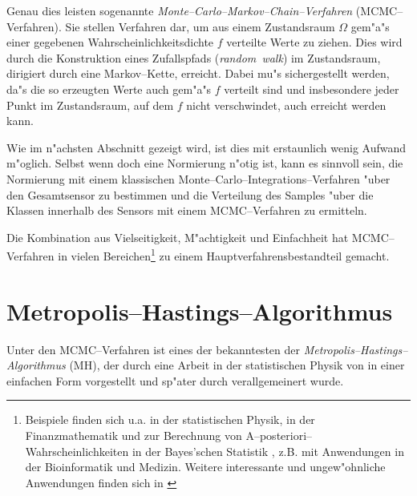 	Genau dies leisten sogenannte {\em Mon\-te--Car\-lo--Mar\-kov--Chain--Ver\-fahr\-en} (MCMC--Verfahren). Sie stellen Verfahren dar, um aus einem Zustandsraum $\Omega$ gem"a"s einer gegebenen Wahrscheinlichkeitsdichte $f$ verteilte Werte zu ziehen. Dies wird durch die Konstruktion eines Zufallspfads ({\em random~walk}) im Zustandsraum, dirigiert durch eine Markov--Kette, erreicht. Dabei mu"s sichergestellt werden, da"s die so erzeugten Werte auch gem"a"s $f$ verteilt sind und insbesondere jeder Punkt im Zustandsraum, auf dem $f$ nicht verschwindet, auch erreicht werden kann.
	
	Wie im n"achsten Abschnitt gezeigt wird, ist dies mit erstaunlich wenig Aufwand m"oglich. Selbst wenn doch eine Normierung n"otig ist, kann es sinnvoll sein, die Normierung mit einem klassischen Monte--Carlo--Integrations--Verfahren "uber den Gesamtsensor zu bestimmen und die Verteilung des Samples "uber die Klassen innerhalb des Sensors mit einem MCMC--Verfahren zu ermitteln.
	
	Die Kombination aus Vielseitigkeit, M"achtigkeit und Einfachheit hat MCMC--Verfahren in vielen Bereichen\footnote{Beispiele finden sich u.a. in der statistischen Physik, in der Finanzmathematik und zur Berechnung von A--posteriori--Wahrscheinlichkeiten in der Bayes'schen Statistik \citep{Geweke:1989p10465}, z.B. mit Anwendungen in der Bioinformatik und Medizin. Weitere interessante und ungew"ohnliche Anwendungen finden sich in \citep{Diaconis:2009p4122}} zu einem Hauptverfahrensbestandteil gemacht.
	
	
	\section{Metropolis--Hastings--Algorithmus}
	Unter den MCMC--Verfahren ist eines der bekanntesten der {\em Metropolis--Hastings--Algorithmus} (MH), der durch eine Arbeit in der statistischen Physik von \citet{Metropolis:1953p3364} in einer einfachen Form vorgestellt und sp"ater durch \citet{Hastings:1970p3387} verallgemeinert wurde.

